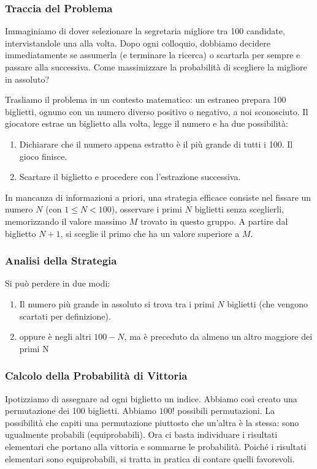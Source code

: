 \subsubsection{Traccia del Problema}
Immaginiamo di dover selezionare la segretaria migliore tra 100 candidate, intervistandole una alla volta. Dopo ogni colloquio, dobbiamo decidere immediatamente se assumerla (e terminare la ricerca) o scartarla per sempre e passare alla successiva. Come massimizzare la probabilità di scegliere la migliore in assoluto?

Trasliamo il problema in un contesto matematico: un estraneo prepara 100 biglietti, ognuno con un numero diverso positivo o negativo, a noi sconosciuto. Il giocatore estrae un biglietto alla volta, legge il numero e ha due possibilità:
\begin{enumerate}
    \item Dichiarare che il numero appena estratto è il più grande di tutti i 100. Il gioco finisce.
    \item Scartare il biglietto e procedere con l'estrazione successiva.
\end{enumerate}

In mancanza di informazioni a priori, una strategia efficace consiste nel fissare un numero $N$ (con $1 \le N < 100$), osservare i primi $N$ biglietti senza sceglierli, memorizzando il valore massimo $M$ trovato in questo gruppo. A partire dal biglietto $N+1$, si sceglie il primo che ha un valore superiore a $M$.

\subsubsection{Analisi della Strategia}
Si può perdere in due modi:
\begin{enumerate}
    \item Il numero più grande in assoluto si trova tra i primi $N$ biglietti (che vengono scartati per definizione).
    \item oppure è negli altri $100 - N$, ma è preceduto da almeno un altro maggiore dei primi N
\end{enumerate}

\subsubsection{Calcolo della Probabilità di Vittoria}
Ipotizziamo di assegnare ad ogni biglietto un indice. Abbiamo così creato una permutazione dei 100 biglietti. Abbiamo $100!$ possibili permutazioni. La possibilità che capiti una permutazione piuttosto che un'altra è la stessa: sono ugualmente probabili (equiprobabili). Ora ci basta individuare i risultati elementari che portano alla vittoria e sommarne le probabilità. Poiché i risultati elementari sono equiprobabili, si tratta in pratica di contare quelli favorevoli.

